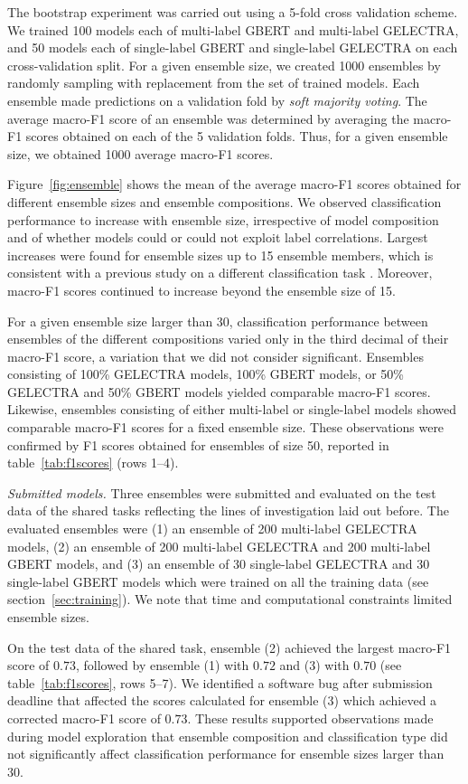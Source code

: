 \documentclass[11pt,a4paper]{article}
\begin{document}
The bootstrap experiment was carried out using a 5-fold cross validation scheme. We trained 100 models each of multi-label GBERT and multi-label GELECTRA, and 50 models each of single-label GBERT and single-label GELECTRA on each cross-validation split. For a given ensemble size, we created 1000 ensembles by randomly sampling with replacement from the set of trained models. Each ensemble made predictions on a validation fold by \emph{soft majority voting}. The average macro-F1 score of an ensemble was determined by averaging the macro-F1 scores obtained on each of the 5 validation folds. Thus, for a given ensemble size, we obtained 1000 average macro-F1 scores.

Figure~\ref{fig:ensemble} shows the mean of the average macro-F1 scores obtained for different ensemble sizes and ensemble compositions. We observed classification performance to increase with ensemble size, irrespective of model composition and of whether models could or could not exploit label correlations. Largest increases were found for ensemble sizes up to 15 ensemble members, which is consistent with a previous study on a different classification task \citep{Risch2020}. Moreover, macro-F1 scores continued to increase beyond the ensemble size of 15.

For a given ensemble size larger than 30, classification performance between ensembles of the different compositions varied only in the third decimal of their macro-F1 score, a variation that we did not consider significant. Ensembles consisting of 100\% GELECTRA models, 100\% GBERT models, or 50\% GELECTRA and 50\% GBERT models yielded comparable macro-F1 scores. Likewise, ensembles consisting of either multi-label or \mbox{single-label} models showed comparable macro-F1 scores for a fixed ensemble size. These observations were confirmed by F1 scores obtained for ensembles of size 50, reported in table~\ref{tab:f1scores} (rows 1--4).

\emph{Submitted models.} Three ensembles were submitted and evaluated on the test data of the shared tasks reflecting the lines of investigation laid out before. The evaluated ensembles were (1) an ensemble of 200 multi-label GELECTRA models, (2) an ensemble of 200 multi-label GELECTRA and 200 multi-label GBERT models, and (3) an ensemble of 30 single-label GELECTRA and 30 single-label GBERT models which were trained on all the training data (see section~\ref{sec:training}). We note that time and computational constraints limited ensemble sizes.

On the test data of the shared task, ensemble (2) achieved the largest macro-F1 score of $0.73$, followed by ensemble (1) with $0.72$ and (3) with $0.70$ (see table~\ref{tab:f1scores}, rows 5--7). We identified a software bug after submission deadline that affected the scores calculated for ensemble (3) which achieved a corrected macro-F1 score of $0.73$. These results supported observations made during model exploration that ensemble composition and classification type did not significantly affect classification performance for ensemble sizes larger than 30.
\end{document}
